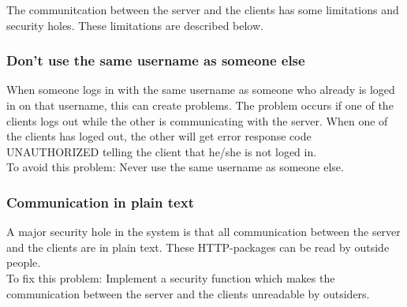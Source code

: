 The communitcation between the server and the clients has some limitations and security holes. These limitations are described below.
\subsubsection{Don't use the same username as someone else}
When someone logs in with the same username as someone who already is loged in on that username, this can create problems. The problem occurs if one of the clients logs out while the other is communicating with the server. When one of the clients has loged out, the other will get error response code UNAUTHORIZED telling the client that he/she is not loged in.
\\To avoid this problem: Never use the same username as someone else.
\subsubsection{Communication in plain text}
A major security hole in the system is that all communication between the server and the clients are in plain text. These HTTP-packages can be read by outside people.
\\To fix this problem: Implement a security function which makes the communication between the server and the clients unreadable by outsiders.
\subsubsection{}
